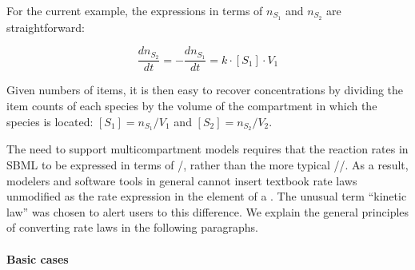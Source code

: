 For the current example, the expressions in terms of $n_{S_1}$ and
$n_{S_2}$ are straightforward:
\begin{linenomath}
\begin{equation*}
  \frac{dn_{S_2}}{dt} = -\frac{dn_{S_1}}{dt} = k \cdot [S_1] \cdot V_1
\end{equation*}
\end{linenomath}
Given numbers of items, it is then easy to recover concentrations
by dividing the item counts of each species by the volume of the
compartment in which the species is located: $[S_1] = n_{S_1}/V_1$
and $[S_2] = n_{S_2}/V_2$.

The need to support multicompartment models requires that the
reaction rates in SBML to be expressed in terms of
/, rather than the more typical
//.  As a
result, modelers and software tools in general cannot insert
textbook rate laws unmodified as the rate expression in the
 element of a \KineticLaw.  The unusual term ``kinetic
law'' was chosen to alert users to this difference.  We explain
the general principles of converting rate laws in the following
paragraphs.



\paragraph{Basic cases}

\newcommand{\relphantom}[1]{\mathrel{\phantom{#1}}}

